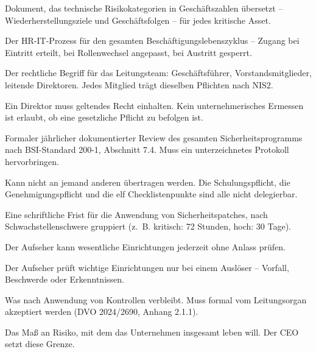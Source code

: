 \documentclass[11pt,a4paper,twoside]{book}
\begin{document}
\begin{description}[style=nextline, leftmargin=0pt, labelindent=0pt, parsep=5pt, itemsep=2pt]
  \item[Geschäftsauswirkungsanalyse (BIA)] Dokument, das technische Risikokategorien in Geschäftszahlen übersetzt -- Wiederherstellungsziele und Geschäftsfolgen -- für jedes kritische Asset.

  \item[Joiner-Mover-Leaver-Prozess] Der HR-IT-Prozess für den gesamten Beschäftigungslebenszyklus -- Zugang bei Eintritt erteilt, bei Rollenwechsel angepasst, bei Austritt gesperrt.

  \item[Leitungsorgan] Der rechtliche Begriff für das Leitungsteam: Geschäftsführer, Vorstandsmitglieder, leitende Direktoren. Jedes Mitglied trägt dieselben Pflichten nach NIS2.

  \item[Legalitätspflicht] Ein Direktor muss geltendes Recht einhalten. Kein unternehmerisches Ermessen ist erlaubt, ob eine gesetzliche Pflicht zu befolgen ist.

  \item[Managementreview] Formaler jährlicher dokumentierter Review des gesamten Sicherheitsprogramms nach BSI-Standard 200-1, Abschnitt 7.4. Muss ein unterzeichnetes Protokoll hervorbringen.

  \item[Nicht delegierbar] Kann nicht an jemand anderen übertragen werden. Die Schulungspflicht, die Genehmigungspflicht und die elf Checklistenpunkte sind alle nicht delegierbar.

  \item[Patch-SLA] Eine schriftliche Frist für die Anwendung von Sicherheitspatches, nach Schwachstellenschwere gruppiert (z.~B. kritisch: 72 Stunden, hoch: 30 Tage).

  \item[Proaktive Aufsicht] Der Aufseher kann wesentliche Einrichtungen jederzeit ohne Anlass prüfen.

  \item[Reaktive Aufsicht] Der Aufseher prüft wichtige Einrichtungen nur bei einem Auslöser -- Vorfall, Beschwerde oder Erkenntnissen.

  \item[Restrisikoakzeptanz] Was nach Anwendung von Kontrollen verbleibt. Muss formal vom Leitungsorgan akzeptiert werden (DVO 2024/2690, Anhang 2.1.1).

  \item[Risikobereitschaft] Das Maß an Risiko, mit dem das Unternehmen insgesamt leben will. Der CEO setzt diese Grenze.


\end{description}
\end{document}
